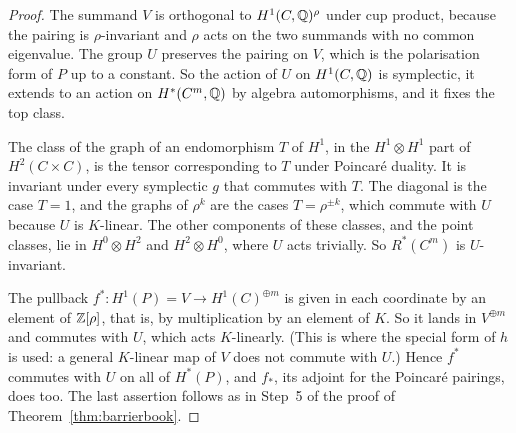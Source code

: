 \begin{proof}
The summand $V$ is orthogonal to $H^{1}(C,\mathbb{Q})^{\rho}$ under cup product,
because the pairing is $\rho$-invariant and $\rho$ acts on the two summands
with no common eigenvalue. The group $U$ preserves the pairing on $V$, which
is the polarisation form of $P$ up to a constant. So the action of $U$ on
$H^{1}(C,\mathbb{Q})$ is symplectic, it extends to an action on $H^{*}(C^{m},\mathbb{Q})$
by algebra automorphisms, and it fixes the top class.

The class of the graph of an endomorphism $T$ of $H^{1}$, in the
$H^{1}\otimes H^{1}$ part of $H^{2}(C\times C)$, is the tensor
corresponding to $T$ under Poincar\'e duality. It is invariant under every
symplectic $g$ that commutes with $T$. The diagonal is the case $T=1$, and
the graphs of $\rho^{k}$ are the cases $T=\rho^{\pm k}$, which commute with
$U$ because $U$ is $K$-linear. The other components of these classes, and
the point classes, lie in $H^{0}\otimes H^{2}$ and $H^{2}\otimes H^{0}$,
where $U$ acts trivially. So $R^{*}(C^{m})$ is $U$-invariant.

The pullback $f^{*}\colon H^{1}(P)=V\to H^{1}(C)^{\oplus m}$ is given in
each coordinate by an element of $\mathbb{Z}[\rho]$, that is, by multiplication by
an element of $K$. So it lands in $V^{\oplus m}$ and commutes with $U$,
which acts $K$-linearly. (This is where the special form of $h$ is used: a
general $K$-linear map of $V$ does not commute with $U$.) Hence $f^{*}$ commutes
with $U$ on all of $H^{*}(P)$, and $f_{*}$, its adjoint for the Poincar\'e
pairings, does too. The last assertion follows as in Step~5 of the proof
of Theorem~\ref{thm:barrierbook}.
\end{proof}

